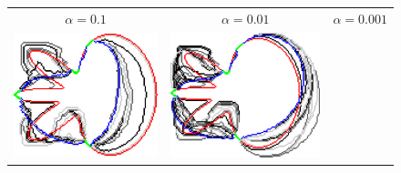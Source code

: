 \begin{figure}
\center
\begin{tabular}{ccc}
$\alpha=0.1$ & $\alpha=0.01$ & $\alpha=0.001$\\[2em]
\includegraphics[scale=0.25]{figures/chapter5/fixed-pixels/elastica/len_pen_0.1/flower-1/summary.pdf} &
\includegraphics[scale=0.25]{figures/chapter5/fixed-pixels/elastica/len_pen_0.01/flower-1/summary.pdf} &

\end{tabular}
\end{figure}
